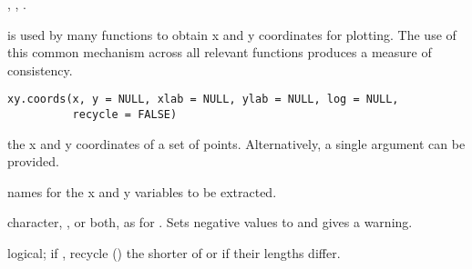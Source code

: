 %
\begin{SeeAlso}\relax
{},
,
.
\end{SeeAlso}
%
\begin{Description}\relax
{} is used by many functions to obtain
x and y coordinates for plotting.  The use of this common mechanism
across all relevant \R{} functions produces a measure of consistency.
\end{Description}
%
\begin{Usage}
\begin{verbatim}
xy.coords(x, y = NULL, xlab = NULL, ylab = NULL, log = NULL,
          recycle = FALSE)
\end{verbatim}
\end{Usage}
%
\begin{Arguments}
\begin{ldescription}
\item[\code{x, y}] the x and y coordinates of a set of points.
Alternatively, a single argument  can be provided.
\item[\code{xlab,ylab}] names for the x and y variables to be extracted.
\item[\code{log}] character, ,  or both, as for
.  Sets negative values to  and
gives a warning.
\item[\code{recycle}] logical; if , recycle ()
the shorter of  or  if their lengths differ.
\end{ldescription}
\end{Arguments}
%
